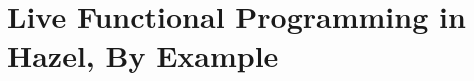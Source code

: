 \newcommand{\examplesSec}{Live Functional Programming in Hazel, By Example}
\section{\protect\examplesSec} %
\label{sec:examples}

